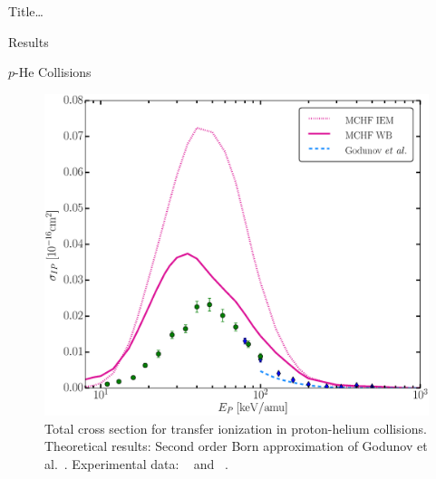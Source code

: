 \documentclass[letterpaper, 10 pt]{report}
\begin{document}
\begin{chapter}{ Title\dots \label{chap:p-he2p-he}}
\begin{section}{Results \label{sec:phe2p-res}}
\begin{subsection}{\texorpdfstring{$p$}{p}-He Collisions \label{sec:phe-res}}
\begin{figure}[ht]
\begin{minipage}{.49\linewidth}
               \centering
               \includegraphics[width = \linewidth]{./images/phe/phe-IP.eps}
               \caption[Total cross section for transfer ionization in proton-helium collisions.]
                       {Total cross section for transfer ionization in proton-helium collisions.
                        Theoretical results: Second order Born approximation of Godunov
                        et al.~\cite{Godunov-06}. Experimental data:
                        {\color{OliveGreen}{$\bullet$}}~\cite{SG89} and
                        {\color{blue}{$\blacklozenge$}}~\cite{SG85}. \label{fig:phe-ip}}
            \end{minipage}
         \end{figure}

         \begin{figure}[ht]
            \begin{minipage}{.49\linewidth}
 

\end{minipage}
\end{figure}
\end{subsection}
\end{section}
\end{chapter}
\end{document}
